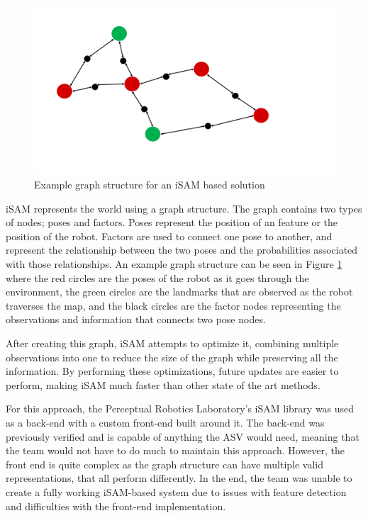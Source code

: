 \documentclass[10pt]{IEEEtran}
\begin{document}
\begin{figure}
	\includegraphics[width=\columnwidth]{Figures/isamGraph}
	\caption{Example graph structure for an iSAM based solution}
	\label{fig:iSAMGraph}
\end{figure}

iSAM represents the world using a graph structure.  The
graph contains two types of nodes; poses and factors.  Poses represent the position of an
feature or the position of the robot.  Factors are used to connect one pose to another, and
represent the relationship between the two poses and the probabilities associated with those
relationships.  An example graph structure can be seen in Figure \ref{fig:iSAMGraph} where the red circles
are the poses of the robot as it goes through the environment, the green circles
are the landmarks that are observed as the robot traverses the map, and the black circles
are the factor nodes representing the observations and information that connects two pose 
nodes.

After creating this graph, iSAM attempts to optimize it, combining multiple observations
into one to reduce the size of the graph while preserving all the information. By performing
these optimizations, future updates are easier to perform, making iSAM much faster than
other state of the art methods.

For this approach, the Perceptual Robotics Laboratory's iSAM library was used as a back-end 
with a custom front-end built around it.  The back-end was previously verified and is capable
of anything the ASV would need, meaning that the team would not have to do much 
to maintain this approach.  However, the front end is quite complex as the graph structure
can have multiple valid representations, that all perform differently.   In the end, the
team was unable to create a fully working iSAM-based system due to issues with feature
detection and difficulties with the front-end implementation.
\end{document}
